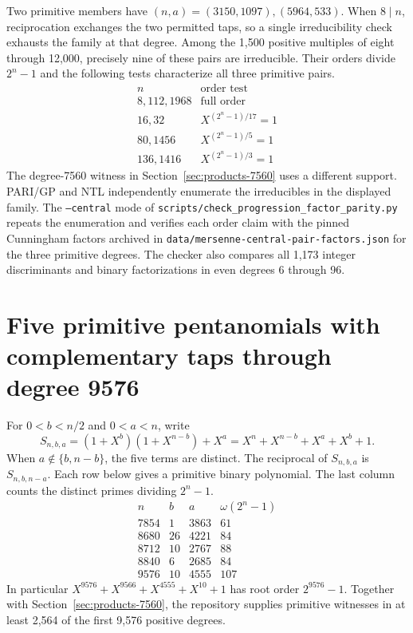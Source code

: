 \documentclass[11pt]{article}
\begin{document}
Two primitive members have \((n,a)=(3150,1097),(5964,533)\).
When \(8\mid n\), reciprocation exchanges the two permitted taps, so
a single irreducibility check exhausts the family at that degree.
Among the 1,500 positive multiples of eight through 12,000, precisely
nine of these pairs are irreducible. Their orders divide \(2^n-1\)
and the following tests characterize all three primitive pairs.
\[
\begin{array}{l|l}
 n&\text{order test}\\\hline
 8,112,1968 & \text{full order}\\
 16,32 & X^{(2^n-1)/17}=1\\
 80,1456 & X^{(2^n-1)/5}=1\\
 136,1416 & X^{(2^n-1)/3}=1
\end{array}
\]
The degree-7560 witness in Section~\ref{sec:products-7560} uses a different
support. PARI/GP and NTL independently enumerate the irreducibles in
the displayed family. The \texttt{--central} mode of \nolinkurl{scripts/check_progression_factor_parity.py}
repeats the enumeration and verifies each order claim with the pinned
Cunningham factors archived in \nolinkurl{data/mersenne-central-pair-factors.json}
for the three primitive degrees. The checker also compares all 1,173
integer discriminants and binary factorizations in even degrees 6 through 96.

\section{Five primitive pentanomials with complementary taps through degree 9576}
\label{sec:symmetric-9576}
For \(0<b<n/2\) and \(0<a<n\), write
\[
 S_{n,b,a}=(1+X^b)(1+X^{n-b})+X^a
          =X^n+X^{n-b}+X^a+X^b+1 .
\]
When \(a\notin\{b,n-b\}\), the five terms are distinct. The reciprocal
of \(S_{n,b,a}\) is \(S_{n,b,n-a}\). Each row below gives a primitive
binary polynomial. The last column counts the distinct primes dividing
\(2^n-1\).
\[
\begin{array}{r|rr|r}
 n& b&a&\omega(2^n-1)\\\hline
 7854& 1&3863&61\\
 8680&26&4221&84\\
 8712&10&2767&88\\
 8840& 6&2685&84\\
 9576&10&4555&107
\end{array}
\]
In particular \(X^{9576}+X^{9566}+X^{4555}+X^{10}+1\) has root order
\(2^{9576}-1\). Together with Section~\ref{sec:products-7560}, the
repository supplies primitive witnesses in at least 2,564 of the first
9,576 positive degrees.
\end{document}
